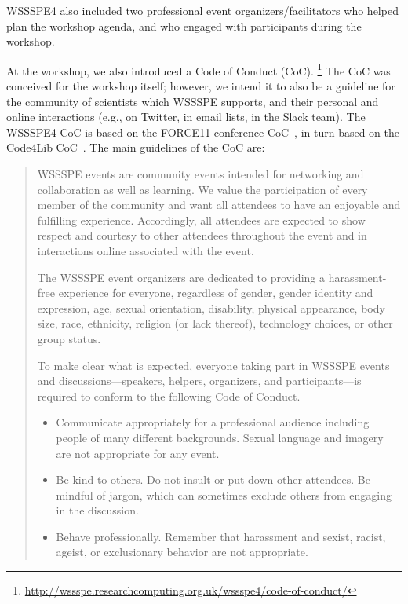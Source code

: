 \documentclass[11pt, oneside]{amsart}
\begin{document}
WSSSPE4 also included two professional event organizers/facilitators who helped 
plan the workshop agenda,
and who engaged with participants during the workshop.

At the workshop, we also introduced a Code of Conduct (CoC).%
\footnote{\url{http://wssspe.researchcomputing.org.uk/wssspe4/code-of-conduct/}}
The CoC was conceived for the workshop itself; however, we intend it
to also be a guideline for the community of scientists which WSSSPE
supports, and their personal and online interactions (e.g., on
Twitter, in email lists, in the Slack team). The WSSSPE4 CoC is based on the
FORCE11 conference CoC~\cite{FORCE11:CoC}, in turn based on the Code4Lib
CoC~\cite{Code4Lib:CoC}.
The main guidelines of the CoC are:
\begin{quote}
    WSSSPE events are community events intended for networking and collaboration
    as well as learning. We value the participation of every member of the
    community and want all attendees to have an enjoyable and fulfilling
    experience. Accordingly, all attendees are expected to show respect and
    courtesy to other attendees throughout the event and in interactions online
    associated with the event.

    The WSSSPE event organizers are dedicated to providing a harassment-free
    experience for everyone, regardless of gender, gender identity and
    expression, age, sexual orientation, disability, physical appearance,
    body size, race, ethnicity, religion (or lack thereof), technology choices,
    or other group status.

    To make clear what is expected, everyone taking part in WSSSPE events and
    discussions---speakers, helpers, organizers, and participants---is required
    to conform to the following Code of Conduct.

    \begin{itemize}
    \item Communicate appropriately for a professional audience including
    people of many different backgrounds. Sexual language and imagery are not
    appropriate for any event.

    \item Be kind to others. Do not insult or put down other attendees. Be
    mindful of jargon, which can sometimes exclude others from engaging in the
    discussion.

    \item Behave professionally. Remember that harassment and sexist, racist,
    ageist, or exclusionary behavior are not appropriate.
    \end{itemize}
\end{quote}
\end{document}
